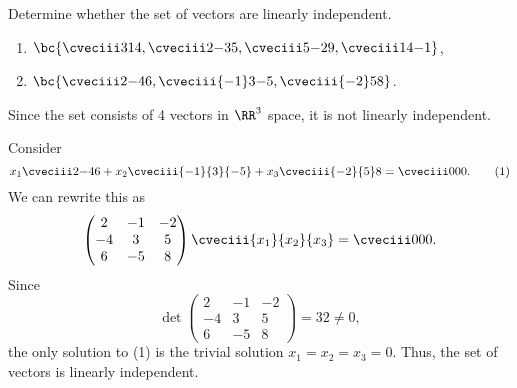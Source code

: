 \begin{problem}
    Determine whether the set of vectors are linearly independent.

    \begin{enumerate}
        \item $\bc{\cveciii314, \cveciii2{-3}5, \cveciii5{-2}{9}, \cveciii14{-1}}$,
        \item $\bc{\cveciii2{-4}6, \cveciii{-1}3{-5}, \cveciii{-2}58}$.
    \end{enumerate}
\end{problem}
\begin{solution}
    \begin{ppart}
        Since the set consists of 4 vectors in $\RR^3$ space, it is not linearly independent.
    \end{ppart}
    \begin{ppart}
        Consider \[x_1 \cveciii2{-4}{6} + x_2 \cveciii{-1}{3}{-5} + x_3 \cveciii{-2}{5}8 = \cveciii000. \tag{1}\] We can rewrite this as \[\begin{pmatrix}2 & -1 & -2 \\ -4 & 3 & 5 \\ 6 & -5 & 8\end{pmatrix} \cveciii{x_1}{x_2}{x_3} = \cveciii000.\] Since \[\det \begin{pmatrix}2 & -1 & -2 \\ -4 & 3 & 5 \\ 6 & -5 & 8\end{pmatrix} = 32 \neq 0,\] the only solution to (1) is the trivial solution $x_1 = x_2 = x_3 = 0$. Thus, the set of vectors is linearly independent.
    \end{ppart}
\end{solution}

